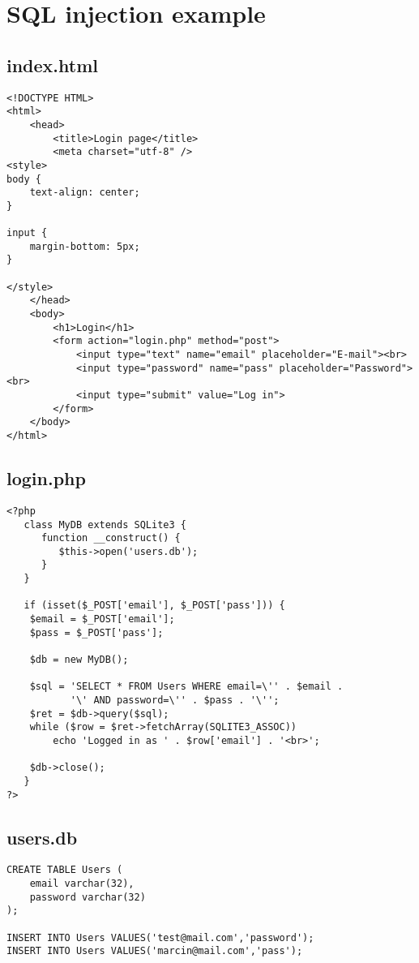 \documentclass[a4paper]{article}
\begin{document}
\newpage

\printbibliography
{}

\newpage

\appendix
\section{SQL injection example}

\subsection{index.html}
\begin{verbatim}
<!DOCTYPE HTML>
<html>
	<head>
		<title>Login page</title>
		<meta charset="utf-8" />
<style>
body {
	text-align: center;
}

input {
	margin-bottom: 5px;
}

</style>
	</head>
	<body>
		<h1>Login</h1>
		<form action="login.php" method="post">
			<input type="text" name="email" placeholder="E-mail"><br>
			<input type="password" name="pass" placeholder="Password"><br>
			<input type="submit" value="Log in">
		</form>
	</body>
</html>
\end{verbatim}
\newpage

\subsection{login.php}
\begin{verbatim}
<?php
   class MyDB extends SQLite3 {
      function __construct() {
         $this->open('users.db');
      }
   }

   if (isset($_POST['email'], $_POST['pass'])) {
	$email = $_POST['email'];
	$pass = $_POST['pass'];

	$db = new MyDB();

	$sql = 'SELECT * FROM Users WHERE email=\'' . $email .
    	   '\' AND password=\'' . $pass . '\'';
	$ret = $db->query($sql);
	while ($row = $ret->fetchArray(SQLITE3_ASSOC))
		echo 'Logged in as ' . $row['email'] . '<br>';

	$db->close();
   }
?>
\end{verbatim}
\newpage

\subsection{users.db}
\begin{verbatim}
CREATE TABLE Users (
	email varchar(32),
	password varchar(32)
);

INSERT INTO Users VALUES('test@mail.com','password');
INSERT INTO Users VALUES('marcin@mail.com','pass');
\end{verbatim}
\newpage
\end{document}
